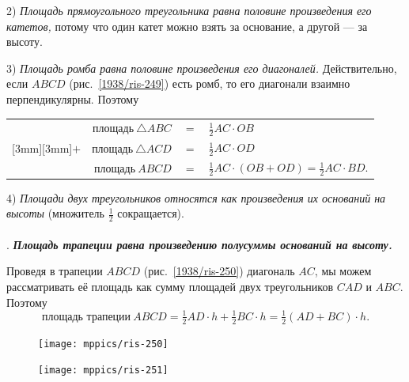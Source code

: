 \documentclass[twoside]{book}
\begin{document}
2) \emph{Площадь прямоугольного треугольника равна половине произведения его катетов,} потому что один катет можно взять за основание, а другой — за высоту.


3) \emph{Площадь ромба равна половине произведения его диагоналей.}
Действительно, если $ABCD$ (рис.~\ref{1938/ris-249}) есть ромб, то его диагонали взаимно перпендикулярны.
Поэтому

\begin{center}
\begin{tabular}{rrcl}
 &$\text{площадь}~\triangle ABC$
 &$=$ 
 &$\tfrac12AC\cdot  OB$
\\
\raisebox{3mm}[3mm][3mm]{$+$} 
& 
$\text{площадь}~\triangle ACD$
&$=$ &$\tfrac12AC\cdot  OD$
\\
\hline
&$\text{площадь}~ABCD$ & $=$&$\tfrac12AC\cdot (OB+OD)=\tfrac12AC\cdot BD.$
\end{tabular}
\end{center}

4) \emph{Площади двух треугольников относятся как произведения их оснований на высоты} (множитель $\tfrac12$ сокращается).


\paragraph{}\label{1938/250}
.
\textbf{\emph{Площадь трапеции равна произведению полусуммы оснований на высоту.}}

Проведя в трапеции $ABCD$ (рис.~\ref{1938/ris-250}) диагональ $AC$, мы можем рассматривать её площадь как сумму площадей двух треугольников $CAD$ и $ABC$.
Поэтому
\[\text{площадь трапеции}~ABCD
=\tfrac12AD\cdot  h+\tfrac12BC\cdot  h= 
\tfrac12(AD+BC) \cdot  h.\]

\begin{figure}[h]
\begin{minipage}{.48\textwidth}
\centering
\texttt{[image: mppics/ris-250]}
\end{minipage}
\hfill
\begin{minipage}{.48\textwidth}
\centering
\texttt{[image: mppics/ris-251]}
\end{minipage}

\medskip

\begin{minipage}{.48\textwidth}
\centering
\caption{}\label{1938/ris-250}
\end{minipage}
\hfill
\begin{minipage}{.48\textwidth}
\centering
\caption{}\label{1938/ris-251}
\end{minipage}
\vskip-4mm
\end{figure}
\end{document}
